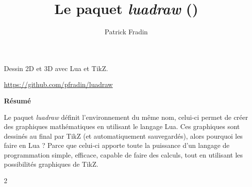 \documentclass[%
10pt,%
oneside,
a4paper,%
french,%
notitlepage
]%
{book}%
\title{\textbf{Le paquet \emph{luadraw} (\version)}}
\author{Patrick Fradin}
\newcommand*{\luadrawenv}{\emph{luadraw}\xspace}%
\begin{document}
\maketitle

\begin{center}
\Large Dessin 2D et 3D avec Lua et TikZ.\par
\small\url{https://github.com/pfradin/luadraw}
\end{center}

\vspace*{2cm} 

\begin{small}
\hfil\textbf{Résumé}\hfil\par
Le paquet \luadrawenv définit l'environnement du même nom, celui-ci permet de créer des graphiques mathématiques en utilisant le langage Lua. Ces graphiques sont dessinés au final par TikZ (et automatiquement sauvegardés), alors pourquoi les faire en Lua ? Parce que celui-ci apporte toute la puissance d'un langage de programmation simple, efficace, capable de faire des calculs, tout en utilisant les possibilités graphiques de TikZ.
\end{small}%


\clearpage%
\setcounter{tocdepth}{3}%
\setcounter{secnumdepth}{2}%

\begin{multicols}{2}
\tableofcontents
\end{multicols}

\listoffigures

\renewcommand{\labelitemi}{$\bullet$}
\renewcommand{\labelitemii}{--}
\renewcommand{\labelitemiii}{$*$}
\renewcommand{\thesection}{\Roman{section}~}
\renewcommand{\thesubsection}{\arabic{subsection})}
\renewcommand{\thesubsubsection}{\arabic{subsection}.\arabic{subsubsection}}
\renewcommand{\thefigure}{\arabic{figure}}




\end{document}
